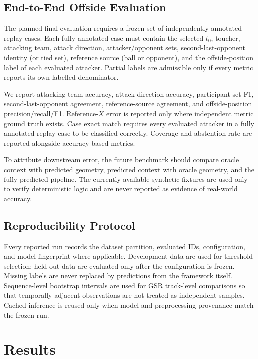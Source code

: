 \documentclass[runningheads]{llncs}
\begin{document}
\subsection{End-to-End Offside Evaluation}
\label{subsec:e2e_eval}
The planned final evaluation requires a frozen set of independently annotated replay cases. Each fully annotated case must contain the selected $t_0$, toucher, attacking team, attack direction, attacker/opponent sets, second-last-opponent identity (or tied set), reference source (ball or opponent), and the offside-position label of each evaluated attacker. Partial labels are admissible only if every metric reports its own labelled denominator.

We report attacking-team accuracy, attack-direction accuracy, participant-set F1, second-last-opponent agreement, reference-source agreement, and offside-position precision/recall/F1. Reference-$X$ error is reported only where independent metric ground truth exists. Case exact match requires every evaluated attacker in a fully annotated replay case to be classified correctly. Coverage and abstention rate are reported alongside accuracy-based metrics.

To attribute downstream error, the future benchmark should compare oracle context with predicted geometry, predicted context with oracle geometry, and the fully predicted pipeline. The currently available synthetic fixtures are used only to verify deterministic logic and are never reported as evidence of real-world accuracy.

\subsection{Reproducibility Protocol}
\label{subsec:reproducibility}
Every reported run records the dataset partition, evaluated IDs, configuration, and model fingerprint where applicable. Development data are used for threshold selection; held-out data are evaluated only after the configuration is frozen. Missing labels are never replaced by predictions from the framework itself. Sequence-level bootstrap intervals are used for GSR track-level comparisons so that temporally adjacent observations are not treated as independent samples. Cached inference is reused only when model and preprocessing provenance match the frozen run.

\section{Results}
\label{sec:results}
\end{document}
